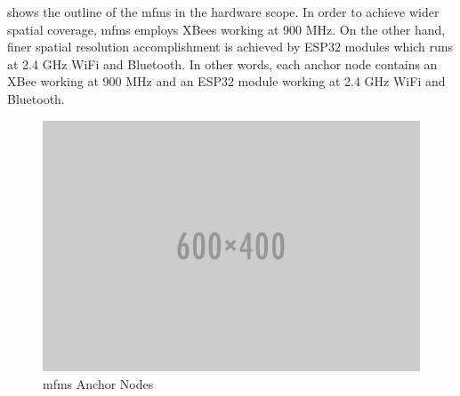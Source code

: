      shows the outline of the \gls{mfms} in the hardware scope.
    In order to achieve wider spatial coverage, \gls{mfms} employs XBees working at 900 MHz.
    On the other hand, finer spatial resolution accomplishment is achieved by ESP32 modules which runs at 2.4 GHz WiFi and Bluetooth.
    In other words, each anchor node contains an XBee working at 900 MHz and an ESP32 module working at 2.4 GHz WiFi and Bluetooth.

    \begin{figure}[thpb]
       \centering
       \includegraphics[width=\linewidth]{figures/placeholder.png}
       \caption{\label{fig:module}\gls{mfms} Anchor Nodes}
    \end{figure}
